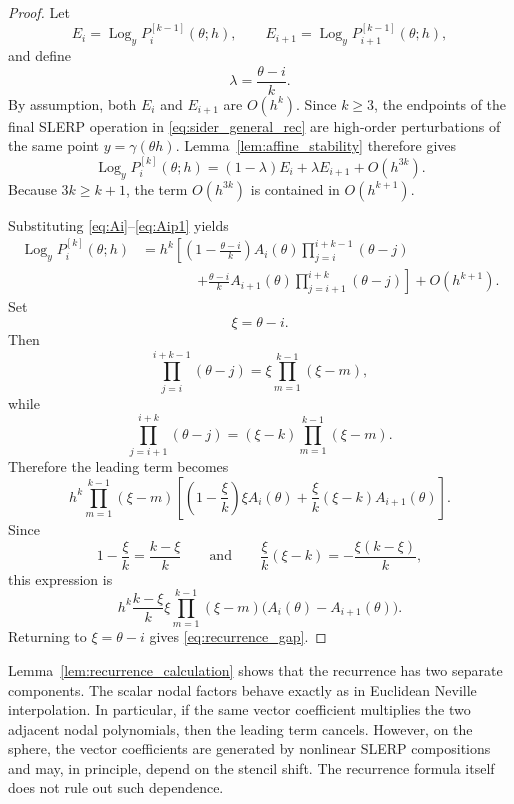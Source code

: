 \documentclass[a4paper,11pt]{article}
\newcommand{\Log}{\operatorname{Log}}
\numberwithin{equation}{section}
\begin{document}
\begin{proof}
Let
\[
        E_i=\Log_y P_i^{[k-1]}(\theta;h),
        \qquad
        E_{i+1}=\Log_y P_{i+1}^{[k-1]}(\theta;h),
\]
and define
\[
        \lambda=\frac{\theta-i}{k}.
\]
By assumption, both \(E_i\) and \(E_{i+1}\) are \(O(h^k)\).  Since \(k\geq3\),
the endpoints of the final SLERP operation in
\eqref{eq:sider_general_rec} are high-order perturbations of the same point
\(y=\gamma(\theta h)\).  Lemma~\ref{lem:affine_stability} therefore gives
\[
\Log_y P_i^{[k]}(\theta;h)
=
(1-\lambda)E_i+\lambda E_{i+1}+O(h^{3k}).
\]
Because \(3k\geq k+1\), the term \(O(h^{3k})\) is contained in
\(O(h^{k+1})\).

Substituting \eqref{eq:Ai}--\eqref{eq:Aip1} yields
\[
\begin{aligned}
\Log_y P_i^{[k]}(\theta;h)
&=
h^k
\left[
\left(1-\frac{\theta-i}{k}\right)A_i(\theta)
\prod_{j=i}^{i+k-1}(\theta-j)
\right.  \\
&\qquad\qquad\left.
+
\frac{\theta-i}{k}A_{i+1}(\theta)
\prod_{j=i+1}^{i+k}(\theta-j)
\right]
+O(h^{k+1}).
\end{aligned}
\]
Set
\[
        \xi=\theta-i .
\]
Then
\[
        \prod_{j=i}^{i+k-1}(\theta-j)
        =
        \xi\prod_{m=1}^{k-1}(\xi-m),
\]
while
\[
        \prod_{j=i+1}^{i+k}(\theta-j)
        =
        (\xi-k)\prod_{m=1}^{k-1}(\xi-m).
\]
Therefore the leading term becomes
\[
h^k
\prod_{m=1}^{k-1}(\xi-m)
\left[
\left(1-\frac{\xi}{k}\right)\xi A_i(\theta)
+
\frac{\xi}{k}(\xi-k)A_{i+1}(\theta)
\right].
\]
Since
\[
        1-\frac{\xi}{k}=\frac{k-\xi}{k}
        \qquad\text{and}\qquad
        \frac{\xi}{k}(\xi-k)
        =
        -\frac{\xi(k-\xi)}{k},
\]
this expression is
\[
h^k
\frac{k-\xi}{k}\xi
\prod_{m=1}^{k-1}(\xi-m)
\bigl(A_i(\theta)-A_{i+1}(\theta)\bigr).
\]
Returning to \(\xi=\theta-i\) gives \eqref{eq:recurrence_gap}.
\end{proof}

Lemma~\ref{lem:recurrence_calculation} shows that the recurrence has two
separate components.  The scalar nodal factors behave exactly as in Euclidean
Neville interpolation.  In particular, if the same vector coefficient
multiplies the two adjacent nodal polynomials, then the leading term cancels.
However, on the sphere, the vector coefficients are generated by nonlinear
SLERP compositions and may, in principle, depend on the stencil shift.  The
recurrence formula itself does not rule out such dependence.
\end{document}
